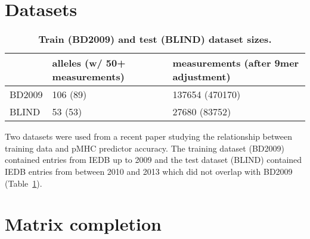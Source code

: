 \section*{Datasets}

\begin{table}
\label{tab:datasets}
\begin{tabular}{lll}
\toprule
{} & alleles (w/ 50+ measurements) & measurements (after 9mer adjustment) \\
\midrule
BD2009 &                      106 (89) &                      137654 (470170) \\
BLIND  &                       53 (53) &                        27680 (83752) \\
\bottomrule
\end{tabular}
\caption{\textbf{Train (BD2009) and test (BLIND) dataset sizes.}}
\end{table}

Two datasets were used from a recent paper studying the relationship between training data and pMHC predictor accuracy\cite{Kim_2014}. The training dataset (BD2009) contained entries from IEDB\cite{Salimi_2012} up to 2009 and the test dataset (BLIND) contained IEDB entries from between 2010 and 2013 which did not overlap with BD2009 (Table~\ref{tab:datasets}).

\section*{Matrix completion}

